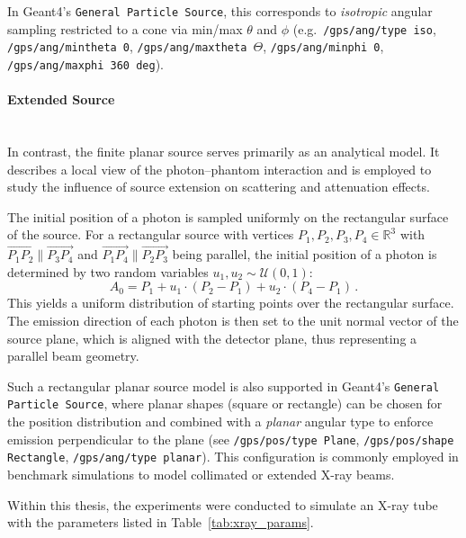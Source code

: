 In Geant4's \texttt{General Particle Source}, this corresponds to
\emph{isotropic} angular sampling restricted to a cone via min/max $\theta$ and
$\phi$ (e.g.\ \texttt{/gps/ang/type iso}, \texttt{/gps/ang/mintheta 0},
\texttt{/gps/ang/maxtheta $\Theta$}, \texttt{/gps/ang/minphi 0},
\texttt{/gps/ang/maxphi 360 deg}).


\paragraph{Extended Source} \ \\
In contrast, the finite planar source serves primarily as an analytical model.
It describes a local view of the photon--phantom interaction and is employed to
study the influence of source extension on scattering and attenuation effects.

The initial position of a photon is sampled uniformly on the rectangular surface
of the source. For a rectangular source with vertices $P_1,P_2,P_3,P_4 \in
\mathbb{R}^3$ with $\overrightarrow{P_1 P_2} \parallel \overrightarrow{P_3 P_4}$
and $\overrightarrow{P_1 P_4} \parallel \overrightarrow{P_2 P_3}$ being
parallel, the initial position of a photon is determined by two random variables
$u_1,u_2 \sim \mathcal{U}(0,1)$:
\begin{equation*}
    A_0 = P_1 + u_1 \cdot (P_2-P_1) + u_2 \cdot (P_4-P_1) \, .
\end{equation*}
This yields a uniform distribution of starting points over the rectangular
surface. The emission direction of each photon is then set to the unit normal
vector of the source plane, which is aligned with the detector plane, thus
representing a parallel beam geometry.

Such a rectangular planar source model is also supported in Geant4's
\texttt{General Particle Source}, where planar shapes (square or rectangle) can
be chosen for the position distribution and combined with a \emph{planar}
angular type to enforce emission perpendicular to the plane (see
\texttt{/gps/pos/type Plane}, \texttt{/gps/pos/shape Rectangle},
\texttt{/gps/ang/type planar}). This configuration is commonly employed in
benchmark simulations to model collimated or extended X-ray beams.

\qquad

Within this thesis, the experiments were conducted to simulate an X-ray tube
with the parameters listed in Table~\ref{tab:xray_params}.

